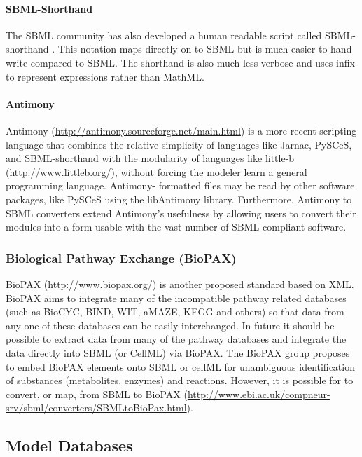 \paragraph{SBML-Shorthand}

The SBML community has also developed a human readable script called
SBML- shorthand \autocite{gillespie2006tools}. This notation maps
directly on to SBML but is much easier to hand write compared to SBML.
The shorthand is also much less verbose and uses infix to represent
expressions rather than MathML.

\paragraph{Antimony}

Antimony (\url{http://antimony.sourceforge.net/main.html})
\autocite{smith2009antimony} is a more recent scripting language that
combines the relative simplicity of languages like Jarnac, PySCeS, and
SBML-shorthand with the modularity of languages like little-b
(\url{http://www.littleb.org/}), without forcing the modeler learn a
general programming language. Antimony- formatted files may be read by
other software packages, like PySCeS using the libAntimony library.
Furthermore, Antimony to SBML converters extend Antimony's usefulness by
allowing users to convert their modules into a form usable with the vast
number of SBML-compliant software.

\subsubsection{Biological Pathway Exchange (BioPAX)}

BioPAX (\url{http://www.biopax.org/}) \autocite{demir2010biopax}
\autocite{stromback2005representations} is another proposed standard
based on XML. BioPAX aims to integrate many of the incompatible pathway
related databases (such as BioCYC, BIND, WIT, aMAZE, KEGG and others) so
that data from any one of these databases can be easily interchanged. In
future it should be possible to extract data from many of the pathway
databases and integrate the data directly into SBML (or CellML) via
BioPAX. The BioPAX group proposes to embed BioPAX elements onto SBML or
cellML for unambiguous identification of substances (metabolites,
enzymes) and reactions. However, it is possible for to convert, or map,
from SBML to BioPAX
(\url{http://www.ebi.ac.uk/compneur-srv/sbml/converters/SBMLtoBioPax.html}).

\subsection{Model Databases}

